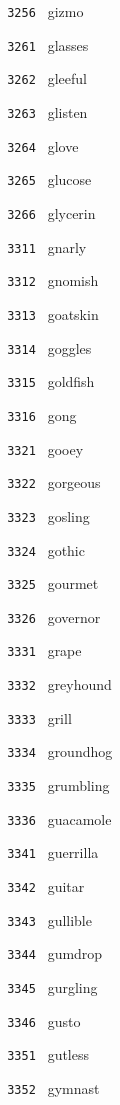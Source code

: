 \documentclass[11pt]{article}
\begin{document}
\begin{multicols}{6}
\noindent \texttt{ 3256 } gizmo  \par
\noindent \texttt{ 3261 } glasses  \par
\noindent \texttt{ 3262 } gleeful  \par
\noindent \texttt{ 3263 } glisten  \par
\noindent \texttt{ 3264 } glove  \par
\noindent \texttt{ 3265 } glucose  \par
\noindent \texttt{ 3266 } glycerin  \par
\noindent \texttt{ 3311 } gnarly  \par
\noindent \texttt{ 3312 } gnomish  \par
\noindent \texttt{ 3313 } goatskin  \par
\noindent \texttt{ 3314 } goggles  \par
\noindent \texttt{ 3315 } goldfish  \par
\noindent \texttt{ 3316 } gong  \par
\noindent \texttt{ 3321 } gooey  \par
\noindent \texttt{ 3322 } gorgeous  \par
\noindent \texttt{ 3323 } gosling  \par
\noindent \texttt{ 3324 } gothic  \par
\noindent \texttt{ 3325 } gourmet  \par
\noindent \texttt{ 3326 } governor  \par
\noindent \texttt{ 3331 } grape  \par
\noindent \texttt{ 3332 } greyhound  \par
\noindent \texttt{ 3333 } grill  \par
\noindent \texttt{ 3334 } groundhog  \par
\noindent \texttt{ 3335 } grumbling  \par
\noindent \texttt{ 3336 } guacamole  \par
\noindent \texttt{ 3341 } guerrilla  \par
\noindent \texttt{ 3342 } guitar  \par
\noindent \texttt{ 3343 } gullible  \par
\noindent \texttt{ 3344 } gumdrop  \par
\noindent \texttt{ 3345 } gurgling  \par
\noindent \texttt{ 3346 } gusto  \par
\noindent \texttt{ 3351 } gutless  \par
\noindent \texttt{ 3352 } gymnast  \par

\end{multicols}
\end{document}
